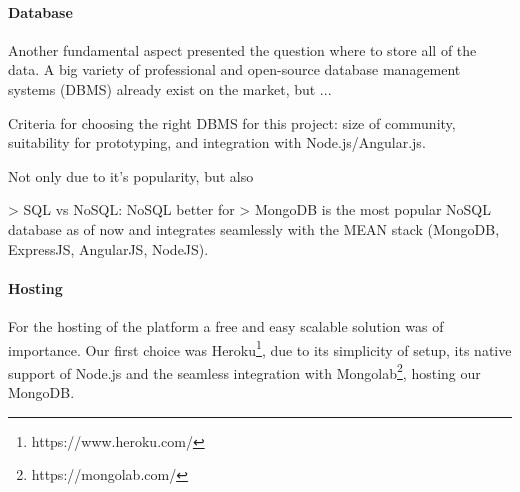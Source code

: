 	\paragraph{Database}

		Another fundamental aspect presented the question where to store all of the data. A big variety of professional and open-source database management systems (DBMS) already exist on the market, but ...

		Criteria for choosing the right DBMS for this project: size of community, suitability for prototyping, and integration with Node.js/Angular.js.

		



		Not only due to it's popularity, but also 


		> SQL vs NoSQL: NoSQL better for 
		> MongoDB is the most popular NoSQL database as of now and integrates seamlessly with the MEAN stack (MongoDB, ExpressJS, AngularJS, NodeJS).




	\paragraph{Hosting}

		For the hosting of the platform a free and easy scalable solution was of importance. Our first choice was Heroku\footnote{https://www.heroku.com/}, due to its simplicity of setup, its native support of Node.js and the seamless integration with Mongolab\footnote{https://mongolab.com/}, hosting our MongoDB.





